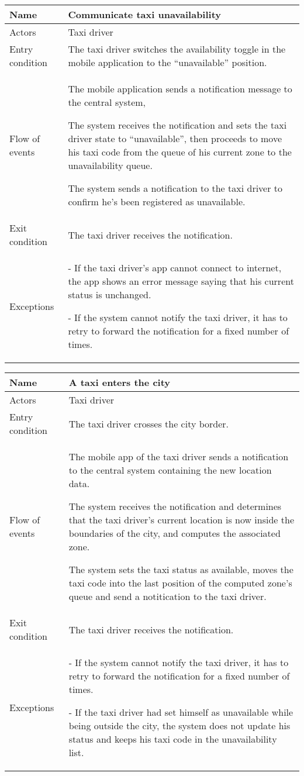\begin{center}
\begin{longtable}{|l| p{9cm}|}
\hline
Name &
Communicate taxi unavailability \\
\hline
Actors &
Taxi driver \\
\hline
Entry condition & 
The taxi driver switches the availability toggle in the mobile application to the “unavailable” position. \\
\hline
Flow of events & 
The mobile application sends a notification message to the central system, 

The system receives the notification and sets the taxi driver state to “unavailable”, then proceeds to move his taxi code from the queue of his current zone to the unavailability queue.

The system sends a notification to the taxi driver to confirm he's been registered as unavailable. \\
\hline
Exit condition &
The taxi driver receives the notification. \\
\hline
Exceptions &
- If the taxi driver's app cannot connect to internet, the app shows an error message saying that his current status is unchanged.

- If the system cannot notify the taxi driver, it has to retry to forward the notification for a fixed number of times. \\
\hline
\end{longtable}



\begin{longtable}{|l| p{9cm}|}
\hline
Name &
A taxi enters the city \\
\hline
Actors &
Taxi driver \\
\hline
Entry condition & 
The taxi driver crosses the city border. \\
\hline
Flow of events & 
The mobile app of the taxi driver sends a notification to the central system containing the new location data. 

The system receives the notification and determines that the taxi driver's current location is now inside the boundaries of the city, and computes the associated zone.

The system sets the taxi status as available, moves the taxi code into the last position of the computed zone’s queue and send a notitication to the taxi driver. \\
\hline
Exit condition &
The taxi driver receives the notification. \\
\hline
Exceptions &
- If the system cannot notify the taxi driver, it has to retry to forward the notification for a fixed number of times.

- If the taxi driver had set himself as unavailable while being outside the city, the system does not update his status and keeps his taxi code in the unavailability list.\\
\hline
\end{longtable}



\end{center}